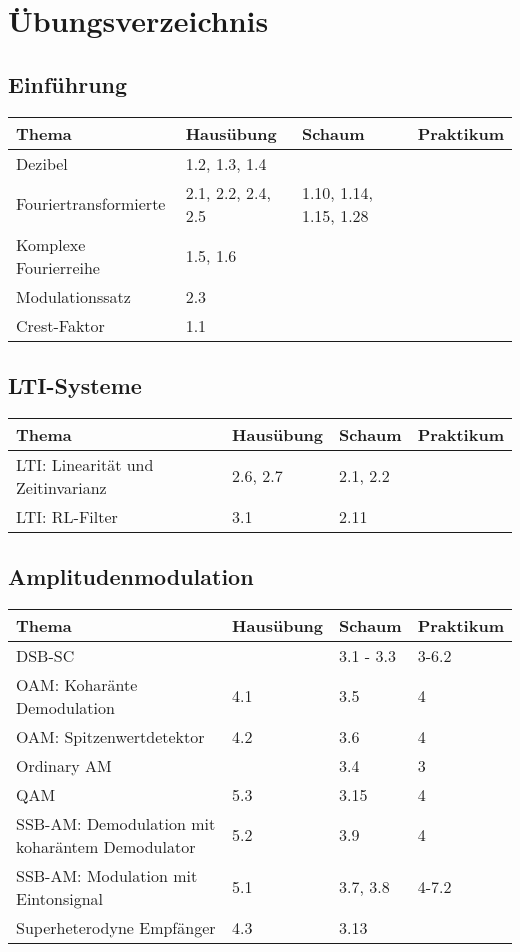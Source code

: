 \section{Übungsverzeichnis}

\subsection{Einführung}
	\begin{tabular}{|p{9cm}|p{2.5cm}|p{3.5cm}|p{2cm}|}
	\hline
	\textbf{Thema} & \textbf{Hausübung} & \textbf{Schaum} & \textbf{Praktikum} \\
	\hline
	Dezibel & 1.2, 1.3, 1.4 &  &  \\
	\hline
	Fouriertransformierte & 2.1, 2.2, 2.4, 2.5 & 1.10, 1.14, 1.15, 1.28 &  \\
	\hline
	Komplexe Fourierreihe & 1.5, 1.6 & & \\
	\hline
	Modulationssatz & 2.3 & & \\
	\hline
	Crest-Faktor & 1.1 & & \\
	\hline
	\end{tabular}

\subsection{LTI-Systeme}
	\begin{tabular}{|p{9cm}|p{2.5cm}|p{3.5cm}|p{2cm}|}
	\hline
	\textbf{Thema} & \textbf{Hausübung} & \textbf{Schaum} & \textbf{Praktikum} \\ \hline
	LTI: Linearität und Zeitinvarianz & 2.6, 2.7 & 2.1, 2.2 &  \\ \hline
	LTI: RL-Filter & 3.1 & 2.11 &  \\ \hline
	\end{tabular}

\subsection{Amplitudenmodulation}
	\begin{tabular}{|p{9cm}|p{2.5cm}|p{3.5cm}|p{2cm}|}
	\hline
	\textbf{Thema} & \textbf{Hausübung} & \textbf{Schaum} & \textbf{Praktikum} \\ \hline
	DSB-SC &  & 3.1 - 3.3 & 3-6.2 \\ \hline
	OAM: Koharänte Demodulation & 4.1 & 3.5 & 4 \\ \hline
	OAM: Spitzenwertdetektor & 4.2 & 3.6 & 4 \\ \hline
	Ordinary AM & & 3.4 & 3 \\ \hline
	QAM & 5.3  & 3.15 & 4 \\ \hline
	SSB-AM: Demodulation mit koharäntem Demodulator & 5.2 & 3.9 & 4 \\
	\hline SSB-AM: Modulation mit Eintonsignal & 5.1 & 3.7, 3.8 & 4-7.2 \\ \hline
	Superheterodyne Empfänger & 4.3 & 3.13 & \\
	\hline
	\end{tabular}

